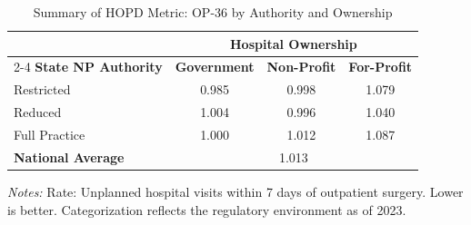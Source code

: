 \begin{table}[htbp]
    \centering
    \caption{Summary of HOPD Metric: OP-36 by Authority and Ownership}
    \label{tab:hopd_op_36_own}
    \vspace{0.2cm}
    \begin{tabular}{lccc}
        \toprule
        & \multicolumn{3}{c}{\textbf{Hospital Ownership}} \\
        \cmidrule(lr){2-4}
        \textbf{State NP Authority} & \textbf{Government} & \textbf{Non-Profit} & \textbf{For-Profit} \\
        \midrule
        Restricted & 0.985 & 0.998 & 1.079 \\
        Reduced & 1.004 & 0.996 & 1.040 \\
        Full Practice & 1.000 & 1.012 & 1.087 \\
        \midrule
        \textbf{National Average} & \multicolumn{3}{c}{1.013} \\
        \bottomrule
    \end{tabular}
    \vspace{0.1cm}
    \begin{minipage}{0.85\textwidth}
        \footnotesize \textit{Notes:} Rate: Unplanned hospital visits within 7 days of outpatient surgery. Lower is better. Categorization reflects the regulatory environment as of 2023.
    \end{minipage}
\end{table}